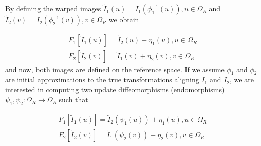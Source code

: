 \documentclass[11pt]{article}
\begin{document}
By defining the warped images $\tilde{I}_{1}(u) = I_{1}(\phi_{1}^{-1}(u)), u \in \Omega_{R}$ and
$\tilde{I}_{2}(v) = I_{2}(\phi_{2}^{-1}(v)), v \in \Omega_{R}$ we obtain

\begin{align}\label{eq:SyNEM_gom_warped}
	F_{1}[\tilde{I}_{1}(u)] = \tilde{I}_{2}(u) + \eta_{1}(u), u\in\Omega_{R} \\
    \nonumber F_{2}[\tilde{I}_{2}(v)] = \tilde{I}_{1}(v) + \eta_{2}(v), v\in\Omega_{R}
\end{align}
and now, both images are defined on the reference space. If we assume $\phi_{1}$ and $\phi_{2}$ are initial approximations to the true transformations aligning $I_{1}$ and $I_{2}$, we are interested in computing two update diffeomorphisms (endomorphisms) \hbox{$\psi_{1}, \psi_{2} : \Omega_{R} \rightarrow \Omega_{R}$} such that

\begin{align}\label{eq:SyNEM_gom_update}
	F_{1}[\tilde{I}_{1}(u)] = \tilde{I}_{2}(\psi_{1}(u)) + \eta_{1}(u), u\in\Omega_{R} \\
    \nonumber F_{2}[\tilde{I}_{2}(v)] = \tilde{I}_{1}(\psi_{2}(v)) + \eta_{2}(v), v\in\Omega_{R}
\end{align}
\end{document}
